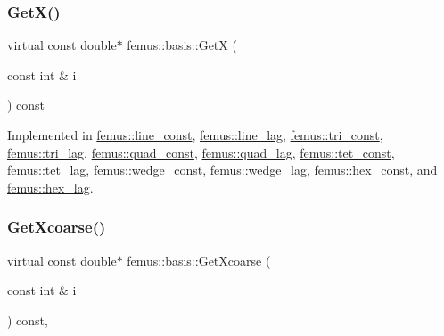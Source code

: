 \subsubsection{\texorpdfstring{Get\+X()}{GetX()}}
{\footnotesize\ttfamily virtual const double$\ast$ femus\+::basis\+::\+GetX (\begin{DoxyParamCaption}\item[{const int \&}]{i }\end{DoxyParamCaption}) const\hspace{0.3cm}{\ttfamily [pure virtual]}}



Implemented in \mbox{\hyperlink{classfemus_1_1line__const_ac4bd40b2dd52c41196e84d328d85691e}{femus\+::line\+\_\+const}}, \mbox{\hyperlink{classfemus_1_1line__lag_a7bb107fa83cf2cc51202f96f10167dc8}{femus\+::line\+\_\+lag}}, \mbox{\hyperlink{classfemus_1_1tri__const_ac085b6cf3dbfcb6a3cd06337c06fd06f}{femus\+::tri\+\_\+const}}, \mbox{\hyperlink{classfemus_1_1tri__lag_adbc5aaa467d849777aa97a6339dd2c4d}{femus\+::tri\+\_\+lag}}, \mbox{\hyperlink{classfemus_1_1quad__const_ae81971dbef2943442e4c10debc5bfa08}{femus\+::quad\+\_\+const}}, \mbox{\hyperlink{classfemus_1_1quad__lag_ad1d8e10798242454170be69efd303523}{femus\+::quad\+\_\+lag}}, \mbox{\hyperlink{classfemus_1_1tet__const_a12c7aec6a462159e1d191e189cdf6d07}{femus\+::tet\+\_\+const}}, \mbox{\hyperlink{classfemus_1_1tet__lag_a9dd1283cbaae6b1203ec9b4082267fb2}{femus\+::tet\+\_\+lag}}, \mbox{\hyperlink{classfemus_1_1wedge__const_a40c858d58d224e133433cf3c071b0acb}{femus\+::wedge\+\_\+const}}, \mbox{\hyperlink{classfemus_1_1wedge__lag_a61a63f8c6773d01c707d49a3038951b3}{femus\+::wedge\+\_\+lag}}, \mbox{\hyperlink{classfemus_1_1hex__const_a96b01f930583ac9d99a0a041f82dd0cc}{femus\+::hex\+\_\+const}}, and \mbox{\hyperlink{classfemus_1_1hex__lag_a1cd01fd5ad9c4c92deaf67e68b9d5a9b}{femus\+::hex\+\_\+lag}}.

\mbox{\label{classfemus_1_1basis_afcabbbda61ede8f30158fe08ee0a5258}} 
\subsubsection{\texorpdfstring{Get\+Xcoarse()}{GetXcoarse()}}
{\footnotesize\ttfamily virtual const double$\ast$ femus\+::basis\+::\+Get\+Xcoarse (\begin{DoxyParamCaption}\item[{const int \&}]{i }\end{DoxyParamCaption}) const\hspace{0.3cm}{\ttfamily [inline]}, {\ttfamily [virtual]}}



